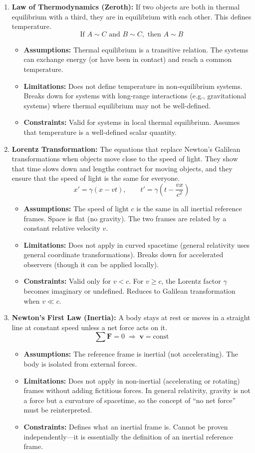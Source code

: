 \documentclass[11pt,openright]{book}
\begin{document}
\begin{enumerate}
\item \textbf{Law of Thermodynamics (Zeroth):} If two objects are both in thermal equilibrium with a third, they are in equilibrium with each other. This defines temperature.
\[
\text{If }A\sim C\text{ and }B\sim C,\text{ then }A\sim B
\]
\begin{itemize}
\item \textbf{Assumptions:} Thermal equilibrium is a transitive relation. The systems can exchange energy (or have been in contact) and reach a common temperature.
\item \textbf{Limitations:} Does not define temperature in non-equilibrium systems. Breaks down for systems with long-range interactions (e.g., gravitational systems) where thermal equilibrium may not be well-defined.
\item \textbf{Constraints:} Valid for systems in local thermal equilibrium. Assumes that temperature is a well-defined scalar quantity.
\end{itemize}

\item \textbf{Lorentz Transformation:} The equations that replace Newton's Galilean transformations when objects move close to the speed of light. They show that time slows down and lengths contract for moving objects, and they ensure that the speed of light is the same for everyone.
\[
x'=\gamma(x-vt),\qquad
t'=\gamma\left(t-\frac{vx}{c^2}\right)
\]
\begin{itemize}
\item \textbf{Assumptions:} The speed of light $c$ is the same in all inertial reference frames. Space is flat (no gravity). The two frames are related by a constant relative velocity $v$.
\item \textbf{Limitations:} Does not apply in curved spacetime (general relativity uses general coordinate transformations). Breaks down for accelerated observers (though it can be applied locally).
\item \textbf{Constraints:} Valid only for $v<c$. For $v\geq c$, the Lorentz factor $\gamma$ becomes imaginary or undefined. Reduces to Galilean transformation when $v\ll c$.
\end{itemize}

\item \textbf{Newton's First Law (Inertia):} A body stays at rest or moves in a straight line at constant speed unless a net force acts on it.
\[
\sum\mathbf F=0 \;\Rightarrow\; \mathbf v=\text{const}
\]
\begin{itemize}
\item \textbf{Assumptions:} The reference frame is inertial (not accelerating). The body is isolated from external forces.
\item \textbf{Limitations:} Does not apply in non-inertial (accelerating or rotating) frames without adding fictitious forces. In general relativity, gravity is not a force but a curvature of spacetime, so the concept of ``no net force'' must be reinterpreted.
\item \textbf{Constraints:} Defines what an inertial frame is. Cannot be proven independently---it is essentially the definition of an inertial reference frame.
\end{itemize}


\end{enumerate}
\end{document}
